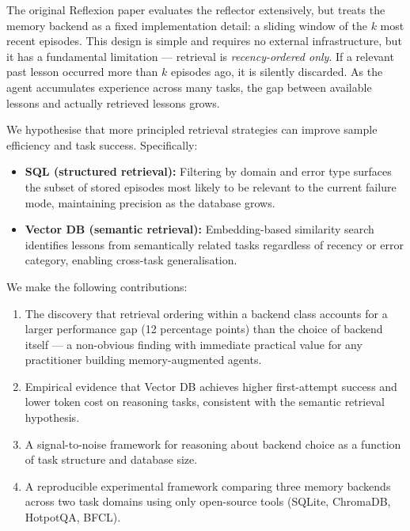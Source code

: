 \documentclass{article}
\begin{document}
The original Reflexion paper evaluates the reflector extensively, but treats
the memory backend as a fixed implementation detail: a sliding window of the
$k$ most recent episodes. This design is simple and requires no external
infrastructure, but it has a fundamental limitation --- retrieval is
\emph{recency-ordered only}. If a relevant past lesson occurred more than $k$
episodes ago, it is silently discarded. As the agent accumulates experience
across many tasks, the gap between available lessons and actually retrieved
lessons grows.

We hypothesise that more principled retrieval strategies can improve sample
efficiency and task success. Specifically:

\begin{itemize}
  \item \textbf{SQL (structured retrieval):} Filtering by domain and error type
    surfaces the subset of stored episodes most likely to be relevant to the
    current failure mode, maintaining precision as the database grows.
  \item \textbf{Vector DB (semantic retrieval):} Embedding-based similarity
    search identifies lessons from semantically related tasks regardless of
    recency or error category, enabling cross-task generalisation.
\end{itemize}

We make the following contributions:
\begin{enumerate}
  \item The discovery that retrieval ordering within a backend class accounts
    for a larger performance gap (12 percentage points) than the choice of
    backend itself --- a non-obvious finding with immediate practical value for
    any practitioner building memory-augmented agents.
  \item Empirical evidence that Vector DB achieves higher first-attempt success
    and lower token cost on reasoning tasks, consistent with the semantic
    retrieval hypothesis.
  \item A signal-to-noise framework for reasoning about backend choice as a
    function of task structure and database size.
  \item A reproducible experimental framework comparing three memory backends
    across two task domains using only open-source tools (SQLite, ChromaDB,
    HotpotQA, BFCL).
\end{enumerate}

\end{document}
